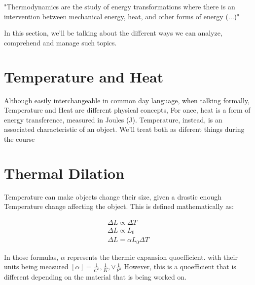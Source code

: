 \documentclass[11pt,fleqn]{book} %
\begin{document}
"Thermodynamics are the study of energy transformations 
where there is an intervention between mechanical energy, 
heat, and other forms of energy (...)" \cite{1}

In this section, we'll be talking about the different ways we can analyze, comprehend and manage such topics.

\section{Temperature and Heat}
Although easily interchangeable in common day language, when talking formally, Temperature and Heat
are different physical concepts, For once, heat is a form of energy transference, measured in Joules (J). 
Temperature, instead, is an associated characteristic of an object. We'll treat both as diferent things during the course

\section{Thermal Dilation}
Temperature can make objects change their size, given a drastic enough Temperature change affecting the object.
This is defined mathematically as:

\begin{gather}
    \Delta L \propto \Delta T\\
    \Delta L \propto L_0\\
    \Delta L = \alpha L_0 \Delta T
\end{gather}

In those formulas, $\alpha$ represents the thermic expansion quoefficient. with 
their units being measured $[\alpha] = \frac{1}{C^o}, \frac{1}{K}, \lor \frac{1}{F^o}$
However, this is a quoefficient that is different depending on the material that is being worked on.


\printbibliography
\end{document}
